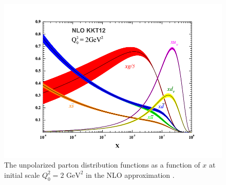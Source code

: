 \documentclass[letterpaper, abstract = on,listof=totoc, bibliography=totoc]{scrreprt}
\begin{document}
\begin{figure}
\begin{center}
\includegraphics[width = .8\textwidth]{unpolDistFunct}
\caption[unpolarized parton distrubution function]{The unpolarized parton distribution functions as a function of $x$ at initial scale $Q^2_0 = 2 \text{ GeV}^2$ in the NLO approximation \cite{unpolDisFuncPic}.}
\label{fig:f1}
\end{center}
\end{figure}

\FloatBarrier
\end{document}
